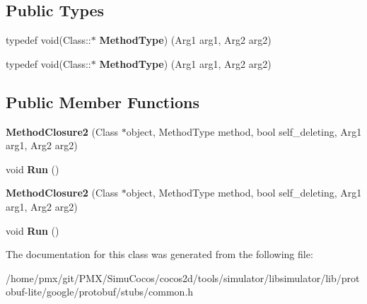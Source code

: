 \subsection*{Public Types}
\begin{DoxyCompactItemize}
\item 
\mbox{\label{classgoogle_1_1protobuf_1_1internal_1_1MethodClosure2_ae74b598d78131afd7f0a5ce8a55ffba0}} 
typedef void(Class\+::$\ast$ {\bfseries Method\+Type}) (Arg1 arg1, Arg2 arg2)
\item 
\mbox{\label{classgoogle_1_1protobuf_1_1internal_1_1MethodClosure2_ae74b598d78131afd7f0a5ce8a55ffba0}} 
typedef void(Class\+::$\ast$ {\bfseries Method\+Type}) (Arg1 arg1, Arg2 arg2)
\end{DoxyCompactItemize}
\subsection*{Public Member Functions}
\begin{DoxyCompactItemize}
\item 
\mbox{\label{classgoogle_1_1protobuf_1_1internal_1_1MethodClosure2_a598580d23ebfccdf3bc5d2557ba773d7}} 
{\bfseries Method\+Closure2} (Class $\ast$object, Method\+Type method, bool self\+\_\+deleting, Arg1 arg1, Arg2 arg2)
\item 
\mbox{\label{classgoogle_1_1protobuf_1_1internal_1_1MethodClosure2_a152b57480b438b36029a0b8311356423}} 
void {\bfseries Run} ()
\item 
\mbox{\label{classgoogle_1_1protobuf_1_1internal_1_1MethodClosure2_a598580d23ebfccdf3bc5d2557ba773d7}} 
{\bfseries Method\+Closure2} (Class $\ast$object, Method\+Type method, bool self\+\_\+deleting, Arg1 arg1, Arg2 arg2)
\item 
\mbox{\label{classgoogle_1_1protobuf_1_1internal_1_1MethodClosure2_a152b57480b438b36029a0b8311356423}} 
void {\bfseries Run} ()
\end{DoxyCompactItemize}


The documentation for this class was generated from the following file\+:\begin{DoxyCompactItemize}
\item 
/home/pmx/git/\+P\+M\+X/\+Simu\+Cocos/cocos2d/tools/simulator/libsimulator/lib/protobuf-\/lite/google/protobuf/stubs/common.\+h\end{DoxyCompactItemize}
